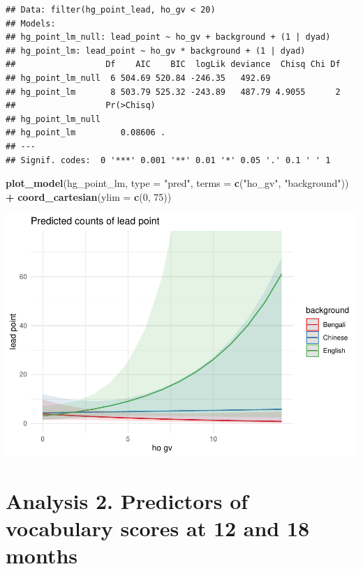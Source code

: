 \documentclass[]{article}
\newenvironment{Shaded}{\begin{snugshade}}{\end{snugshade}}
\newcommand{\DataTypeTok}[1]{\textcolor[rgb]{0.13,0.29,0.53}{#1}}
\newcommand{\DecValTok}[1]{\textcolor[rgb]{0.00,0.00,0.81}{#1}}
\newcommand{\KeywordTok}[1]{\textcolor[rgb]{0.13,0.29,0.53}{\textbf{#1}}}
\newcommand{\NormalTok}[1]{#1}
\newcommand{\OperatorTok}[1]{\textcolor[rgb]{0.81,0.36,0.00}{\textbf{#1}}}
\newcommand{\StringTok}[1]{\textcolor[rgb]{0.31,0.60,0.02}{#1}}
\begin{document}
\begin{verbatim}
## Data: filter(hg_point_lead, ho_gv < 20)
## Models:
## hg_point_lm_null: lead_point ~ ho_gv + background + (1 | dyad)
## hg_point_lm: lead_point ~ ho_gv * background + (1 | dyad)
##                  Df    AIC    BIC  logLik deviance  Chisq Chi Df
## hg_point_lm_null  6 504.69 520.84 -246.35   492.69              
## hg_point_lm       8 503.79 525.32 -243.89   487.79 4.9055      2
##                  Pr(>Chisq)  
## hg_point_lm_null             
## hg_point_lm         0.08606 .
## ---
## Signif. codes:  0 '***' 0.001 '**' 0.01 '*' 0.05 '.' 0.1 ' ' 1
\end{verbatim}

\begin{Shaded}
\begin{Highlighting}[]
\KeywordTok{plot_model}\NormalTok{(hg_point_lm, }\DataTypeTok{type =} \StringTok{"pred"}\NormalTok{, }\DataTypeTok{terms =} \KeywordTok{c}\NormalTok{(}\StringTok{"ho_gv"}\NormalTok{, }\StringTok{"background"}\NormalTok{)) }\OperatorTok{+}\StringTok{ }\KeywordTok{coord_cartesian}\NormalTok{(}\DataTypeTok{ylim =} \KeywordTok{c}\NormalTok{(}\DecValTok{0}\NormalTok{, }\DecValTok{75}\NormalTok{))}
\end{Highlighting}
\end{Shaded}

\includegraphics{supplement_files/figure-latex/hg-point-plot-1.pdf}

\newpage

\hypertarget{analysis-2.-predictors-of-vocabulary-scores-at-12-and-18-months}{%
\section{Analysis 2. Predictors of vocabulary scores at 12 and 18
months}\label{analysis-2.-predictors-of-vocabulary-scores-at-12-and-18-months}}
\end{document}
